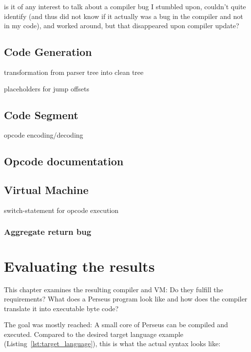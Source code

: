 			is it of any interest to talk about a compiler bug I stumbled upon, couldn't quite identify (and thus did not know if it actually was a bug in the compiler and not in my code), and worked around, but that disappeared upon compiler update?
	
	\section{Code Generation}
	
		transformation from parser tree into clean tree
		
		placeholders for jump offsets
	
	\section{Code Segment}
		
		opcode encoding/decoding
	
	\section{Opcode documentation}
	
	\section{Virtual Machine}
	
		switch-statement for opcode execution
		
		\subsection{Aggregate return bug}


\chapter{Evaluating the results}
This chapter examines the resulting compiler and VM: Do they fulfill the requirements? What does a Perseus program look like and how does the compiler translate it into executable byte code?

The goal was mostly reached: A small core of Perseus can be compiled and executed. Compared to the desired target language example (Listing~\ref{lst:target_language}), this is what the actual syntax looks like:

